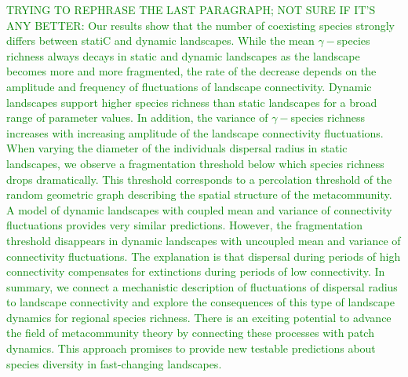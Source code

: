 \documentclass[12pt]{article}
\newcommand{\JK}[1]{\textcolor{Green}{#1}}
\begin{document}
\JK{TRYING TO REPHRASE THE LAST PARAGRAPH; NOT SURE IF IT'S ANY BETTER: Our results show that the number of coexisting species strongly differs between statiC and dynamic landscapes. While the mean $\gamma-$species richness always decays in static and dynamic landscapes as the landscape becomes more and more fragmented, the rate of the decrease depends on the amplitude and frequency of fluctuations of landscape connectivity. Dynamic landscapes support higher species richness than static landscapes for a broad range of parameter values. In addition, the variance of $\gamma-$species richness increases with increasing amplitude of the landscape connectivity fluctuations. When varying the diameter of the individuals dispersal radius in static landscapes, we observe a fragmentation threshold below which species richness drops dramatically. This threshold corresponds to a percolation threshold of the random geometric graph describing the spatial structure of the metacommunity. A model of dynamic landscapes with coupled mean and variance of connectivity fluctuations provides very similar predictions. However, the fragmentation threshold disappears in dynamic landscapes with uncoupled mean and variance of connectivity fluctuations. The explanation is that dispersal during periods of high connectivity compensates for extinctions during periods of low connectivity. In summary, we connect a mechanistic description of fluctuations of dispersal radius to landscape connectivity and explore the consequences of this type of landscape dynamics for regional species richness. There is an exciting potential to advance the field of metacommunity theory by connecting these processes with patch dynamics. This approach promises to provide new testable predictions about species diversity in fast-changing landscapes.}
\end{document}
